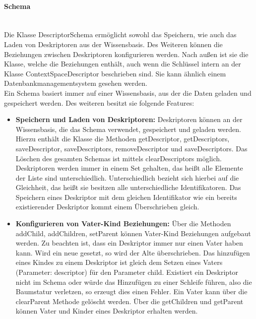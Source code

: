 \documentclass[a4paper]{article}
\begin{document}
	\paragraph{Schema}\mbox{} \\
	
	Die Klasse DescriptorSchema ermöglicht sowohl das Speichern, wie auch das
	Laden von Deskriptoren aus der Wissensbasis. Des Weiteren können die
	Beziehungen	zwischen Deskriptoren konfigurieren werden.
	Nach außen ist sie die Klasse, welche die Beziehungen enthält, auch wenn die
	Schlüssel intern an der Klasse ContextSpaceDescriptor beschrieben sind. Sie kann
	ähnlich einem Datenbankmanagementsystem gesehen werden. \\
	
	Ein Schema basiert immer auf einer Wissensbasis, aus der die Daten geladen und
	gespeichert werden. Des weiteren besitzt sie folgende Features:
	
	\begin{itemize}
		\item \textbf{Speichern und Laden von Deskriptoren:} Deskriptoren können
		an der Wissensbasis, die das Schema verwendet, gespeichert und
		geladen werden. Hierzu enthält die Klasse die Methoden getDescriptor,
		getDescriptors, saveDescriptor, saveDescriptors, removeDescriptor und
		saveDescriptors. Das Löschen des gesamten Schemas ist mittels 
		clearDescriptors möglich. Deskriptoren werden immer in einem Set gehalten,
		das heißt alle Elemente der Liste sind unterschiedlich. Unterschiedlich
		bezieht sich hierbei auf die Gleichheit, das heißt sie besitzen alle
		unterschiedliche Identifikatoren. Das Speichern eines Deskriptor mit dem
		gleichen Identifikator wie ein bereits existierender Deskriptor
		kommt einem Überschrieben gleich.
		\newpage
		\item \textbf{Konfigurieren von Vater-Kind Beziehungen:} Über die Methoden 
		addChild, addChildren, setParent können Vater-Kind Beziehungen aufgebaut
		werden. Zu beachten ist, dass ein Deskriptor immer nur einen Vater
		haben kann. Wird ein neue gesetzt, so wird der Alte überschrieben. Das
		hinzufügen eines Kindes zu einem Deskriptor ist gleich dem Setzen eines 
		Vaters (Parameter: descriptor) für den Parameter child. Existiert ein
		Deskriptor nicht im Schema oder würde das Hinzufügen zu einer
		Schleife führen, also die Baumstatur verletzen, so erzeugt dies einen
		Fehler.	Ein Vater kann über die clearParent Methode gelöscht werden. Über
		die getChildren	und getParent können Vater und Kinder eines Deskriptor
		erhalten werden.
	\end{itemize}
	
\end{document}
